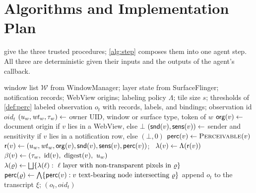 \section{Algorithms and Implementation Plan}\label{sec:algorithms}

 give the three trusted procedures; \cref{alg:step} composes them into one agent step. All three are deterministic given their inputs and the outputs of the agent's callback.

\begin{algorithm}[t]
\caption{\LS{}: \textsc{Observe}$(t)$}\label{alg:label}
\small
\begin{algorithmic}[1]
\Require window list $\mathcal{W}$ from WindowManager; layer state from SurfaceFlinger; notification records; WebView origins; labeling policy $\Lambda$; tile size $s$; thresholds of \cref{def:perc}
\Ensure labeled observation $o_t$ with records, labels, and bindings; observation id $\mathit{oid}_t$
  \State $(u_w,\mathit{wt}_w,\tau_w)\gets$ owner UID, window or surface type, token of $w$
    \State $\mathsf{org}(v)\gets$ document origin if $v$ lies in a WebView, else $\bot$
    \State $(\mathsf{snd}(v),\mathsf{sens}(v))\gets$ sender and sensitivity if $v$ lies in a notification row, else $(\bot,0)$
    \State $\mathsf{perc}(v)\gets \textsc{Perceivable}(v)$ 
    \State $\mathsf{r}(v)\gets(u_w,\mathit{wt}_w,\mathsf{org}(v),\mathsf{snd}(v),\mathsf{sens}(v),\mathsf{perc}(v))$; \ $\lambda(v)\gets\Lambda(\mathsf{r}(v))$
    \State $\bind(v)\gets(\tok_w,\ \mathrm{id}(v),\ \mathrm{digest}(v),\ u_w)$
  \EndFor
\EndFor
{}
  \State $\lambda(\varrho)\gets\bigsqcup\{\lambda(\ell):\ \ell \text{ layer with non-transparent pixels in } \varrho\}$ 
  \State $\mathsf{perc}(\varrho)\gets\bigwedge\{\mathsf{perc}(v): v \text{ text-bearing node intersecting } \varrho\}$
\EndFor
\State append $o_t$ to the transcript $\xi$; \Return $(o_t,\mathit{oid}_t)$
\end{algorithmic}
\end{algorithm}

